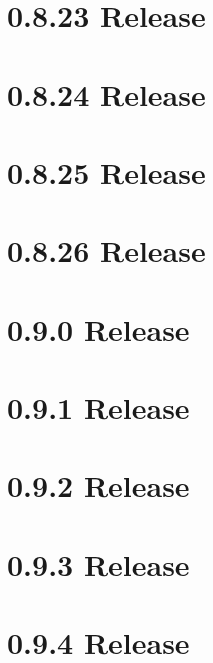 \documentclass[twoside]{book}
\newcommand{\+}{\discretionary{\mbox{\scriptsize$\hookleftarrow$}}{}{}}
\begin{document}
\chapter{0.8.23 Release}
\label{doc_news_2018-05-13_0_8_23_md}

\chapter{0.8.24 Release}
\label{doc_news_2018-08-18_0_8_24_md}

\chapter{0.8.25 Release}
\label{doc_news_2018-11-18_0_8_25_md}

\chapter{0.8.26 Release}
\label{doc_news_2019-02-26_0_8_26_md}

\chapter{0.9.0 Release}
\label{doc_news_2019-08-06_0_9_0_md}

\chapter{0.9.1 Release}
\label{doc_news_2019-11-26_0_9_1_md}

\chapter{0.9.2 Release}
\label{doc_news_2020-05-26_0_9_2_md}

\chapter{0.9.3 Release}
\label{doc_news_2020-10-30_0_9_3_md}

\chapter{0.9.4 Release}
\label{doc_news_2021-02-01_0_9_4_md}

\end{document}
